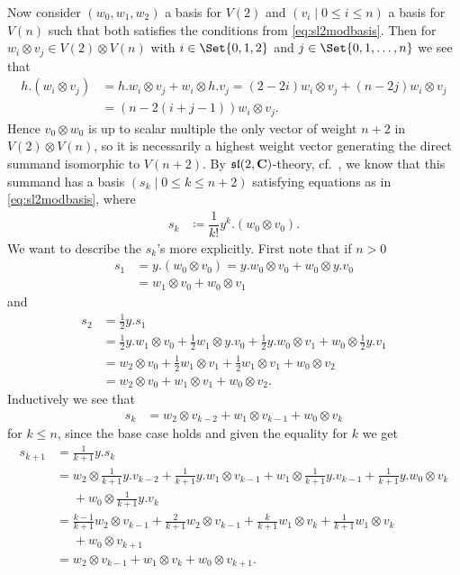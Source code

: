 Now consider $(w_0,w_1,w_2)$ a basis for $V(2)$ and $(v_i \mid 0\leq i\leq n)$ a basis for $V(n)$ such that both satisfies the conditions from \cref{eq:sl2modbasis}. Then for $w_i\otimes v_j \in V(2)\otimes V(n)$ with $i\in\Set{0,1,2}$ and $j\in\Set{0,1,\dotsc,n}$ we see that
\begin{align}
  h.(w_i\otimes v_j) &= h.w_i\otimes v_j + w_i\otimes h.v_j = (2-2i)w_i\otimes v_j + (n-2j)w_i\otimes v_j \nonumber \\
  &= (n-2(i+j-1))w_i\otimes v_j.\label{eq:hontensor}
\end{align}
Hence $v_0\otimes w_0$ is up to scalar multiple the only vector of weight $n+2$ in $V(2)\otimes V(n)$, so it is necessarily a highest weight vector generating the direct summand isomorphic to $V(n+2)$. By $\mathfrak{sl}(2,\mathbf{C})$-theory, cf.\ \cite[36]{jantzen}, we know that this summand has a basis $(s_k\mid 0\leq k\leq n+2)$ satisfying equations as in \cref{eq:sl2modbasis}, where
\begin{align*}
  s_k &\coloneqq \dfrac{1}{k!} y^k.(w_0\otimes v_0).
\end{align*}
We want to describe the $s_k$'s more explicitly. First note that if $n>0$
\begin{align*}
  s_1 &= y.(w_0\otimes v_0) = y.w_0\otimes v_0 + w_0\otimes y.v_0 \\
  &= w_1\otimes v_0 + w_0\otimes v_1
\end{align*}
and
\begin{align*}
  s_2 &= \tfrac{1}{2}y.s_1 \\
      &= \tfrac{1}{2}y.w_1\otimes v_0 + \tfrac{1}{2}w_1\otimes y.v_0 + \tfrac{1}{2}y.w_0\otimes v_1 + w_0\otimes \tfrac{1}{2}y.v_1 \\
      &= w_2\otimes v_0 + \tfrac{1}{2}w_1\otimes v_1 + \tfrac{1}{2}w_1\otimes v_1 + w_0\otimes v_2 \\
  &= w_2\otimes v_0 + w_1\otimes v_1 + w_0\otimes v_2.
\end{align*}
Inductively we see that
\begin{align*}
  s_k &= w_2\otimes v_{k-2} + w_1\otimes v_{k-1} + w_0\otimes v_k
\end{align*}
for $k\leq n$, since the base case holds and given the equality for $k$ we get
\begin{align*}
  s_{k+1} &= \tfrac{1}{k+1}y.s_k \\
          &= w_2\otimes\tfrac{1}{k+1}y.v_{k-2} + \tfrac{1}{k+1}y.w_1\otimes v_{k-1} + w_1\otimes\tfrac{1}{k+1}y.v_{k-1} + \tfrac{1}{k+1}y.w_0\otimes v_k \\
  &\phantom{{}={}}{} + w_0\otimes \tfrac{1}{k+1}y.v_k \\
          &= \tfrac{k-1}{k+1}w_2\otimes v_{k-1} + \tfrac{2}{k+1}w_2\otimes v_{k-1} + \tfrac{k}{k+1}w_1\otimes v_k + \tfrac{1}{k+1}w_1\otimes v_k \\
          &\phantom{{}={}}{} + w_0\otimes v_{k+1} \\
  &= w_2\otimes v_{k-1} + w_1\otimes v_k + w_0\otimes v_{k+1}.
\end{align*}
